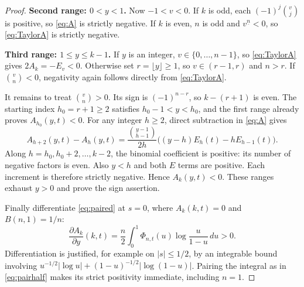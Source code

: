 \documentclass[11pt]{article}
\theoremstyle{definition}
\newcommand{\fall}[2]{#1^{\underline{#2}}}
\begin{document}
\begin{proof}
\medskip\noindent\textbf{Second range: $0<y<1$.}
Now $-1<v<0$. If $k$ is odd, each $(-1)^j\binom vj$ is positive, so \eqref{eq:A} is strictly negative. If $k$ is even, $n$ is odd and $\fall vn<0$, so \eqref{eq:TaylorA} is strictly negative.

\medskip\noindent\textbf{Third range: $1\le y\le k-1$.}
If $y$ is an integer, $v\in\{0,\ldots,n-1\}$, so \eqref{eq:TaylorA} gives $2A_k=-E_v<0$. Otherwise set $r=\lfloor y\rfloor\ge1$, so $v\in(r-1,r)$ and $n>r$. If $\binom vn<0$, negativity again follows directly from \eqref{eq:TaylorA}.

It remains to treat $\binom vn>0$. Its sign is $(-1)^{n-r}$, so $k-(r+1)$ is even. The starting index $h_0=r+1\ge2$ satisfies $h_0-1<y<h_0$, and the first range already proves $A_{h_0}(y,t)<0$. For any integer $h\ge2$, direct subtraction in \eqref{eq:A} gives
\begin{equation}\label{eq:step}
 A_{h+2}(y,t)-A_h(y,t)
 =\frac{\binom{y-1}{h-1}}{2h}
          \bigl((y-h)E_h(t)-hE_{h-1}(t)\bigr).
\end{equation}
Along $h=h_0,h_0+2,\ldots,k-2$, the binomial coefficient is positive: its number of negative factors is even. Also $y<h$ and both $E$ terms are positive. Each increment is therefore strictly negative. Hence $A_k(y,t)<0$. These ranges exhaust $y>0$ and prove the sign assertion.

Finally differentiate \eqref{eq:paired} at $s=0$, where $A_k(k,t)=0$ and $B(n,1)=1/n$:
\begin{equation}\label{eq:Aderivative}
 \frac{\partial A_k}{\partial y}(k,t)
   =\frac n2\int_0^1\Phi_{n,t}(u)\log\frac{u}{1-u}\,du>0.
\end{equation}
Differentiation is justified, for example on $|s|\le1/2$, by an integrable bound involving $u^{-1/2}|\log u|+(1-u)^{-1/2}|\log(1-u)|$. Pairing the integral as in \eqref{eq:pairhalf} makes its strict positivity immediate, including $n=1$.
\end{proof}
\end{document}
